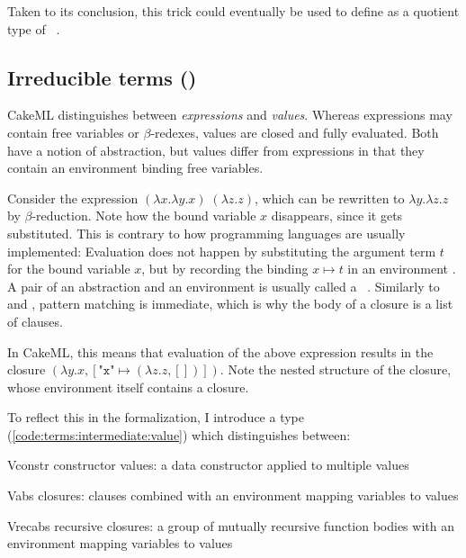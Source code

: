 \noindent
Taken to its conclusion, this trick could eventually be used to define  as a quotient type of ~\cite{huffman2013lifting}.


\subsection{Irreducible terms ()}
\label{sec:terms:types:value}

CakeML distinguishes between \emph{expressions} and \emph{values}.
Whereas expressions may contain free variables or $\beta$-redexes, values are closed and fully evaluated.
Both have a notion of abstraction, but values differ from expressions in that they contain an environment binding free variables.

Consider the expression $(\lambda x. \lambda y. x)\;(\lambda z. z)$, which can be rewritten to $\lambda y. \lambda z. z$ by $\beta$-reduction.
Note how the bound variable $x$ disappears, since it gets substituted.
This is contrary to how programming languages are usually implemented:
Evaluation does not happen by substituting the argument term $t$ for the bound variable $x$, but by recording the binding $x \mapsto t$ in an environment \cite{kumar2014cakeml}.
A pair of an abstraction and an environment is usually called a ~\cite{landin1964mechanical,turner2013history}.
Similarly to  and , pattern matching is immediate, which is why the body of a closure is a list of clauses.

In CakeML, this means that evaluation of the above expression results in the closure $(\lambda y. x, \left[\texttt{"x"} \mapsto (\lambda z. z, []) \right])$.
Note the nested structure of the closure, whose environment itself contains a closure.

To reflect this in the formalization, I introduce a  type (\cref{code:terms:intermediate:value}) which distinguishes between:
\begin{induction}
  \item[Vconstr] constructor values: a data constructor applied to multiple values
  \item[Vabs] closures: clauses combined with an environment mapping variables to values
  \item[Vrecabs] recursive closures: a group of mutually recursive function bodies with an environment mapping variables to values
\end{induction}

